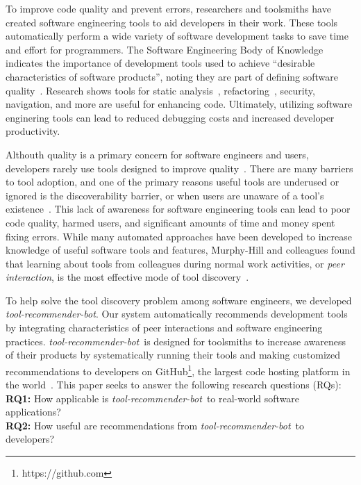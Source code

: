 \documentclass[sigconf,review,anonymous]{acmart}
\newcommand{\tool}{\textsl{tool-recommender-bot}}
\begin{document}
To improve code quality and prevent errors, researchers and toolsmiths have created software engineering tools to aid developers in their work. These tools automatically perform a wide variety of software development tasks to save time and effort for programmers. The Software Engineering Body of Knowledge indicates the importance of development tools used to achieve ``desirable characteristics of software products'', noting they are part of defining software quality~\cite{SWEBOK}. Research shows tools for static analysis~\cite{UsingStaticAnalysis}, refactoring~\cite{Murphy-HillFitness}, security, navigation, and more are useful for enhancing code. Ultimately, utilizing software enginering tools can lead to reduced debugging costs and increased developer productivity.

Althouth quality is a primary concern for software engineers and users, developers rarely use tools designed to improve quality~\cite{Johnson2013Why}. There are many barriers to tool adoption, and one of the primary reasons useful tools are underused or ignored is the discoverability barrier, or when users are unaware of a tool's existence~\cite{Murphy-HillScreencastingDiscovery}. This lack of awareness for software engineering tools can lead to poor code quality, harmed users, and significant amounts of time and money spent fixing errors. While many automated approaches have been developed to increase knowledge of useful software tools and features, Murphy-Hill and colleagues found that learning about tools from colleagues during normal work activities, or \textit{peer interaction}, is the most effective mode of tool discovery~\cite{MurphyHill2011PeerInteraction}.

To help solve the tool discovery problem among software engineers, we developed \tool. Our system automatically recommends development tools by integrating characteristics of peer interactions and software engineering practices. \tool~is designed for toolsmiths to increase awareness of their products by systematically running their tools and making customized recommendations to developers on GitHub\footnote{https://github.com}, the largest code hosting platform in the world~\cite{GousiosGitHub}. This paper seeks to answer the following research questions (RQs): \\

\noindent
\textbf{RQ1:} How applicable is \tool~to real-world software applications?  \\ 
\textbf{RQ2:} How useful are recommendations from \tool~to developers?  \\
\end{document}
